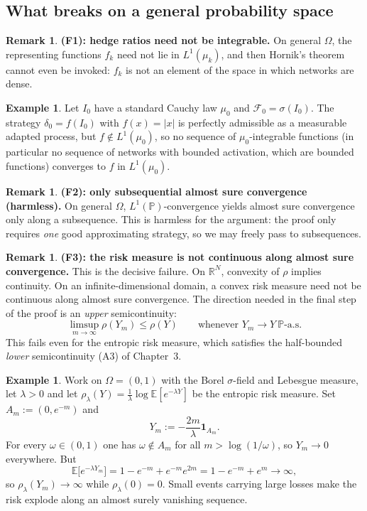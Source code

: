\documentclass[11pt,a4paper]{report}
\numberwithin{equation}{chapter}
\theoremstyle{plain}
\theoremstyle{definition}
\newtheorem{example}[proposition]{Example}
\newtheorem{remark}[proposition]{Remark}
\newcommand{\E}{\mathbb{E}}
\newcommand{\PP}{\mathbb{P}}
\newcommand{\R}{\mathbb{R}}
\newcommand{\F}{\mathcal{F}}
\newcommand{\as}{\ \PP\text{-a.s.}}
\begin{document}
\subsection*{What breaks on a general probability space}

\begin{remark}
  \textbf{(F1): hedge ratios need not be integrable.}
  On general $\Omega$, the representing functions $f_k$ need not lie in
  $L^1(\mu_k)$, and then Hornik's theorem cannot even be invoked: $f_k$ is
  not an element of the space in which networks are dense.
\end{remark}

\begin{example}\label{ex:integrability}
  Let $I_0$ have a standard Cauchy law $\mu_0$ and $\F_0=\sigma(I_0)$.
  The strategy $\delta_0=f(I_0)$ with $f(x)=|x|$ is perfectly admissible
  as a measurable adapted process, but $f\notin L^1(\mu_0)$, so no
  sequence of $\mu_0$-integrable functions (in particular no sequence
  of networks with bounded activation, which are bounded functions)
  converges to $f$ in $L^1(\mu_0)$.
\end{example}

\begin{remark}
  \textbf{(F2): only subsequential almost sure convergence (harmless).}
  On general $\Omega$, $L^1(\PP)$-convergence yields almost sure
  convergence only along a subsequence. This is harmless for the
  argument: the proof only requires \emph{one} good approximating
  strategy, so we may freely pass to subsequences.
\end{remark}

\begin{remark}
  \textbf{(F3): the risk measure is not continuous along almost sure
    convergence.}
  This is the decisive failure. On $\R^N$, convexity of $\rho$ implies
  continuity. On an infinite-dimensional domain, a convex risk measure
  need not be continuous along almost sure convergence. The direction needed
  in the final step of the proof is an \emph{upper} semicontinuity:
  \[
    \limsup_{m\to\infty}\rho(Y_m)\le\rho(Y)\qquad\text{whenever }Y_m\to Y\as
  \]
  This fails even for the entropic risk measure, which satisfies the
  half-bounded \emph{lower} semicontinuity (A3) of Chapter~3.
\end{remark}

\begin{example}\label{ex:explosion}
  Work on $\Omega=(0,1)$ with the Borel $\sigma$-field and Lebesgue
  measure, let $\lambda>0$ and let
  $\rho_\lambda(Y)=\frac{1}{\lambda}\log\E[e^{-\lambda Y}]$ be the
  entropic risk measure. Set $A_m:=(0,e^{-m})$ and
  \[
    Y_m:=-\frac{2m}{\lambda}\mathbf{1}_{A_m}.
  \]
  For every $\omega\in(0,1)$ one has $\omega\notin A_m$ for all
  $m>\log(1/\omega)$, so $Y_m\to0$ everywhere. But
  \[
    \E\bigl[e^{-\lambda Y_m}\bigr]=1-e^{-m}+e^{-m}e^{2m}
    =1-e^{-m}+e^{m}\longrightarrow\infty,
  \]
  so $\rho_\lambda(Y_m)\to\infty$ while $\rho_\lambda(0)=0$. Small
  events carrying large losses make the risk explode along an almost
  surely vanishing sequence.
\end{example}
\end{document}
